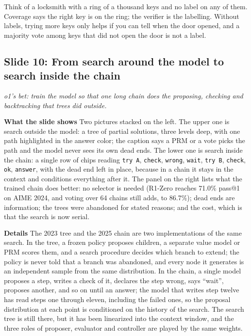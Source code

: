 \documentclass[11pt,letterpaper]{article}
\newcommand{\slide}[3]{%
  \subsection[Slide #1: #2]{Slide #1: #2}%
  {\color{muted}\itshape #3\par}\medskip}
\newcommand{\para}[1]{\medskip\noindent\textbf{#1}\quad}
\newenvironment{intuition}{\begin{tcolorbox}[intuitionbox]}{\end{tcolorbox}}
\begin{document}
\begin{intuition}
Think of a locksmith with a ring of a thousand keys and no label on any of them. Coverage says the right key is on the ring; the verifier is the labelling. Without labels, trying more keys only helps if you can tell when the door opened, and a majority vote among keys that did not open the door is not a label.
\end{intuition}

\slide{10}{From search around the model to search inside the chain}{o1's bet: train the model so that one long chain does the proposing, checking and backtracking that trees did outside.}

\para{What the slide shows} Two pictures stacked on the left. The upper one is search outside the model: a tree of partial solutions, three levels deep, with one path highlighted in the answer color; the caption says a PRM or a vote picks the path and the model never sees its own dead ends. The lower one is search inside the chain: a single row of chips reading \texttt{try A}, \texttt{check}, \texttt{wrong}, \texttt{wait}, \texttt{try B}, \texttt{check}, \texttt{ok}, \texttt{answer}, with the dead end left in place, because in a chain it stays in the context and conditions everything after it. The panel on the right lists what the trained chain does better: no selector is needed (R1-Zero reaches 71.0\% pass@1 on AIME 2024, and voting over 64 chains still adds, to 86.7\%); dead ends are information; the trees were abandoned for stated reasons; and the cost, which is that the search is now serial.

\para{Details} The 2023 tree and the 2025 chain are two implementations of the same search. In the tree, a frozen policy proposes children, a separate value model or PRM scores them, and a search procedure decides which branch to extend; the policy is never told that a branch was abandoned, and every node it generates is an independent sample from the same distribution. In the chain, a single model proposes a step, writes a check of it, declares the step wrong, says ``wait'', proposes another, and so on until an answer; the model that writes step twelve has read steps one through eleven, including the failed ones, so the proposal distribution at each point is conditioned on the history of the search. The search tree is still there, but it has been linearized into the context window, and the three roles of proposer, evaluator and controller are played by the same weights.
\end{document}
